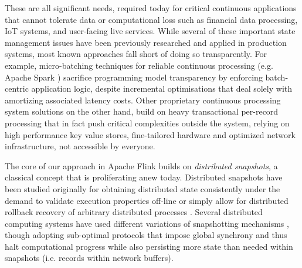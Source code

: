 These are all significant needs, required today for critical continuous applications that cannot tolerate data or computational loss such as financial data processing, IoT systems, and user-facing live services. 
While several of these important state management issues have been previously researched and applied in production systems, most known approaches fall short of doing so transparently. For example, micro-batching techniques for reliable continuous processing (e.g. Apache Spark \cite{zaharia2012discretized}) sacrifice programming model transparency by enforcing batch-centric application logic, despite incremental optimisations \cite{venkataramandrizzle} that deal solely with amortizing associated latency costs. Other proprietary continuous processing system solutions \cite{millwheel} on the other hand, build on heavy transactional per-record processing that in fact push critical complexities outside the system, relying on high performance key value stores, fine-tailored hardware and optimized network infrastructure, not accessible by everyone. 


The core of our approach in Apache Flink builds on \emph{distributed snapshots}, a  classical concept that is proliferating anew today. Distributed snapshots have been studied originally for obtaining distributed state consistently under the demand to validate execution properties off-line or simply allow for distributed rollback recovery of arbitrary distributed processes \cite{elnozahy2002survey}. Several distributed computing systems have used different variations of snapshotting mechanisms \cite{murray2013naiad,low2012distributed}, though adopting sub-optimal protocols that impose global synchrony and thus halt computational progress while also persisting more state than needed within snapshots (i.e. records within network buffers).


